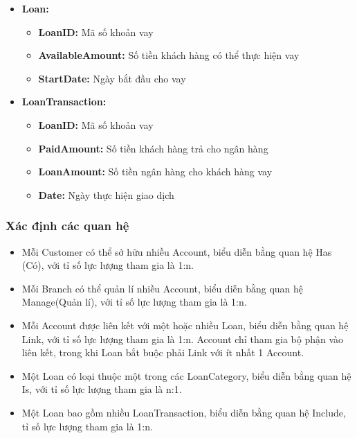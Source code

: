 \documentclass{article}
\begin{document}
\begin{itemize}
    \item \textbf{Loan:}
    \begin{itemize}
        \item \textbf{LoanID:} Mã số khoản vay
        \item \textbf{AvailableAmount:} Số tiền khách hàng có thể thực hiện vay
        \item \textbf{StartDate:} Ngày bắt đầu cho vay
    \end{itemize}
    
    \item \textbf{LoanTransaction:}
    \begin{itemize}
        \item \textbf{LoanID:} Mã số khoản vay
        \item \textbf{PaidAmount:} Số tiền khách hàng trả cho ngân hàng
        \item \textbf{LoanAmount:} Số tiền ngân hàng cho khách hàng vay
        \item \textbf{Date:} Ngày thực hiện giao dịch
    \end{itemize}
\end{itemize}

\subsubsection{Xác định các quan hệ}
\begin{itemize}
    \item Mỗi Customer có thể sở hữu nhiều Account, biểu diễn bằng quan hệ Has (Có), với tỉ số lực lượng tham gia là 1:n.
    \item Mỗi Branch có thể quản lí nhiều Account, biểu diễn bằng quan hệ Manage(Quản lí), với tỉ số lực lượng tham gia là 1:n.
    \item Mỗi Account được liên kết với một hoặc nhiều Loan, biểu diễn bằng quan hệ Link, với tỉ số lực lượng tham gia là 1:n.
    Account chỉ tham gia bộ phận vào liên kết, trong khi Loan bắt buộc phải Link với ít nhất 1 Account.
    \item Một Loan có loại thuộc một trong các LoanCategory, biểu diễn bằng quan hệ Is, với tỉ số lực lượng tham gia là n:1.
    \item Một Loan bao gồm nhiều LoanTransaction, biểu diễn bằng quan hệ Include, tỉ số lực lượng tham gia là 1:n.
    
\end{itemize}
\end{document}
